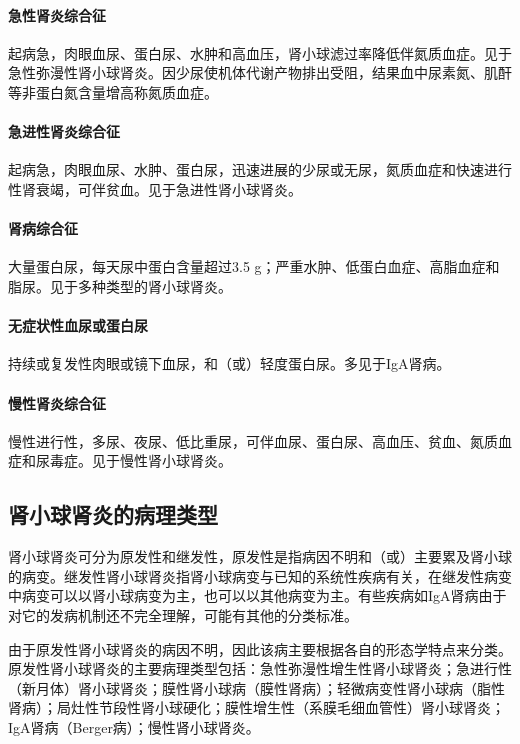 \paragraph{急性肾炎综合征}
起病急，肉眼血尿、蛋白尿、水肿和高血压，肾小球滤过率降低伴氮质血症。见于急性弥漫性肾小球肾炎。因少尿使机体代谢产物排出受阻，结果血中尿素氮、肌酐等非蛋白氮含量增高称氮质血症。

\paragraph{急进性肾炎综合征}
起病急，肉眼血尿、水肿、蛋白尿，迅速进展的少尿或无尿，氮质血症和快速进行性肾衰竭，可伴贫血。见于急进性肾小球肾炎。

\paragraph{肾病综合征}
大量蛋白尿，每天尿中蛋白含量超过3.5
g；严重水肿、低蛋白血症、高脂血症和脂尿。见于多种类型的肾小球肾炎。

\paragraph{无症状性血尿或蛋白尿}
持续或复发性肉眼或镜下血尿，和（或）轻度蛋白尿。多见于IgA肾病。

\paragraph{慢性肾炎综合征}
慢性进行性，多尿、夜尿、低比重尿，可伴血尿、蛋白尿、高血压、贫血、氮质血症和尿毒症。见于慢性肾小球肾炎。

\subsection{肾小球肾炎的病理类型}

肾小球肾炎可分为原发性和继发性，原发性是指病因不明和（或）主要累及肾小球的病变。继发性肾小球肾炎指肾小球病变与已知的系统性疾病有关，在继发性病变中病变可以以肾小球病变为主，也可以以其他病变为主。有些疾病如IgA肾病由于对它的发病机制还不完全理解，可能有其他的分类标准。

由于原发性肾小球肾炎的病因不明，因此该病主要根据各自的形态学特点来分类。原发性肾小球肾炎的主要病理类型包括：急性弥漫性增生性肾小球肾炎；急进行性（新月体）肾小球肾炎；膜性肾小球病（膜性肾病）；轻微病变性肾小球病（脂性肾病）；局灶性节段性肾小球硬化；膜性增生性（系膜毛细血管性）肾小球肾炎；IgA肾病（Berger病）；慢性肾小球肾炎。

